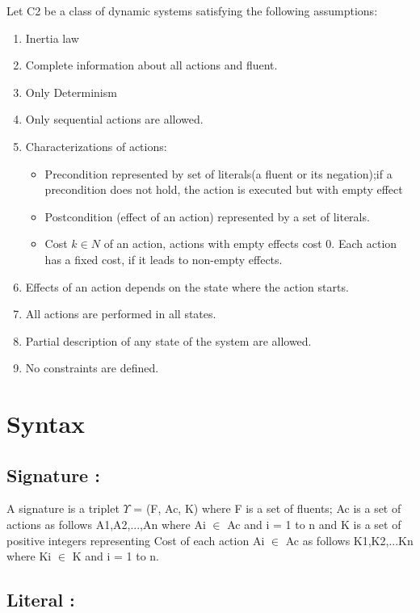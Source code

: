 \documentclass[11pt]{article}
\begin{document}
	Let C2 be a class of dynamic systems satisfying the following assumptions:
	\begin{enumerate}
		\item Inertia law
		\item Complete information about all actions and fluent. 
		\item Only Determinism
		\item Only sequential actions are allowed.
		\item Characterizations of actions:\begin{itemize}
			\item Precondition represented by set of literals(a fluent or its negation);if a precondition does not hold, the action is executed but with empty effect
			\item Postcondition (effect of an action) represented by a set of literals.
			\item Cost $k \in N $ of an action, actions with empty effects cost 0. Each action has a fixed cost, if it leads to non-empty effects. 
		\end{itemize}
		\item Effects of an action depends on the state where the action starts.
		\item All actions are performed in all states.
		\item Partial description of any state of the system are allowed.
		\item No constraints are defined.	 
	\end{enumerate}
	
	\section{Syntax}\label{sec:syntax}
	
	
	\subsection{Signature :}\label{sec:Signature} 

A signature is a triplet $\Upsilon$ = (F, Ac, K) where F is a set of fluents; Ac is a set of actions as follows A1,A2,...,An where Ai $\in$ Ac and i = 1 to n and K is a set of positive integers representing Cost of each action Ai $\in$ Ac as follows K1,K2,...Kn where Ki $\in$ K and i = 1 to n.

\subsection{Literal :}\label{sec:Literal} 
\end{document}

